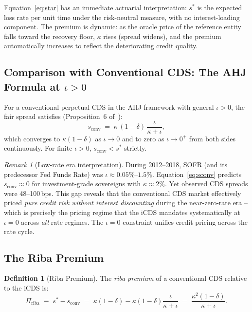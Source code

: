 \documentclass[12pt]{article}
\theoremstyle{plain}
\theoremstyle{definition}
\newtheorem{definition}{Definition}[section]
\theoremstyle{remark}
\newtheorem{remark}{Remark}[section]
\begin{document}
Equation~\eqref{eq:star} has an immediate actuarial interpretation:
$s^*$ is the expected loss rate per unit time under the risk-neutral measure,
with no interest-loading component.
The premium is dynamic: as the oracle price of the reference entity falls
toward the recovery floor, $\kappa$ rises (spread widens), and the premium
automatically increases to reflect the deteriorating credit quality.

\subsection{Comparison with Conventional CDS: The AHJ Formula at $\iota > 0$}

For a conventional perpetual CDS in the AHJ framework with general
$\iota > 0$, the fair spread satisfies (Proposition~6 of~\cite{AHJ2024}):
\begin{equation}
  s_{\text{conv}} \;=\; \kappa\,(1-\delta)\,\frac{\iota}{\kappa + \iota},
  \label{eq:sconv}
\end{equation}
which converges to $\kappa(1-\delta)$ as $\iota \to 0$ and to zero as
$\iota \to 0^+$ from both sides continuously.
For finite $\iota > 0$, $s_{\text{conv}} < s^*$ strictly.

\begin{remark}[Low-rate era interpretation]
  During 2012--2018, SOFR (and its predecessor Fed Funds Rate) was
  $\iota \approx 0.05\%$--$1.5\%$.
  Equation~\eqref{eq:sconv} predicts $s_{\text{conv}} \approx 0$ for
  investment-grade sovereigns with $\kappa \approx 2\%$.
  Yet observed CDS spreads were 48--100\,bps.
  This gap reveals that the conventional CDS market effectively priced
  \emph{pure credit risk without interest discounting} during the
  near-zero-rate era -- which is precisely the pricing regime that
  the iCDS mandates systematically at $\iota = 0$ across \emph{all} rate
  regimes. The $\iota=0$ constraint unifies credit pricing across the rate cycle.
\end{remark}

\subsection{The Riba Premium}

\begin{definition}[Riba Premium]
  The \emph{riba premium} of a conventional CDS relative to the iCDS is:
  \begin{equation}
    \Pi_{\text{riba}} \;\equiv\; s^* - s_{\text{conv}}
      \;=\; \kappa(1-\delta) - \kappa(1-\delta)\frac{\iota}{\kappa+\iota}
      \;=\; \frac{\kappa^2(1-\delta)}{\kappa + \iota}.
    \label{eq:riba_prem}
  \end{equation}
\end{definition}
\end{document}
